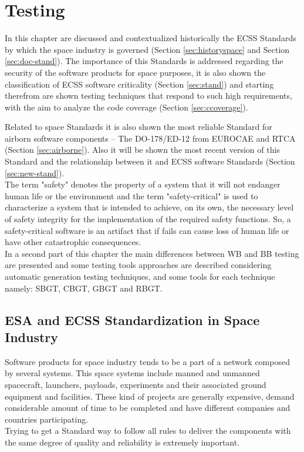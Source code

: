 \chapter{Testing}
\minitoc
In this chapter are discussed and contextualized historically the \ac{ECSS} Standards by which the space industry is governed (Section \ref{sec:historyspace} and Section \ref{sec:doc-stand}).
The importance of this Standards is addressed regarding the security of the software products for space purposes, it is also
shown the classification of \ac{ECSS} software criticality (Section \ref{sec:stand}) and starting therefrom are shown testing techniques that 
respond to such high requirements, with the aim to analyze the code coverage (Section \ref{sec:ccoverage}).

Related to space Standards it is also shown the most reliable Standard for airborn software components -- The DO-178/ED-12 from \ac{EUROCAE} and \ac{RTCA} (Section \ref{sec:airborne}).
Also it will be shown the most recent version of this Standard and the relationship between it and \ac{ECSS} software Standards (Section \ref{sec:new-stand}).\\
The term "safety" denotes the property of a system that it will not endanger human life or the environment and
the term "safety-critical" is used to characterize a
system that is intended to achieve, on its own, the necessary level of safety integrity for the implementation of the required safety functions.
So, a safety-critical software is an artifact that if
fails can cause loss of human life or have other catastrophic consequences.\\

In a second part of this chapter the main differences between \ac{WB} and \ac{BB} testing are presented and
some testing tools approaches are described considering automatic generation testing techniques, and some tools for each technique namely:
\ac{SBGT}, \ac{CBGT}, \ac{GBGT} and
\ac{RBGT}.
\section{ESA and ECSS Standardization in Space Industry}
Software products for space industry tends to be a part of a network composed by several systems. This space systems include manned and unmanned spacecraft,
launchers, payloads, experiments and their associated ground equipment and facilities\cite{Mattiello-FranciscoSanAmbJogCos:2007:BrSoIn}.
These kind of projects are generally  expensive, demand considerable amount of time to be completed and have different companies and countries participating.\\
Trying to get a Standard way to follow all rules to deliver the components with the same degree of quality and reliability is extremely important.\\

